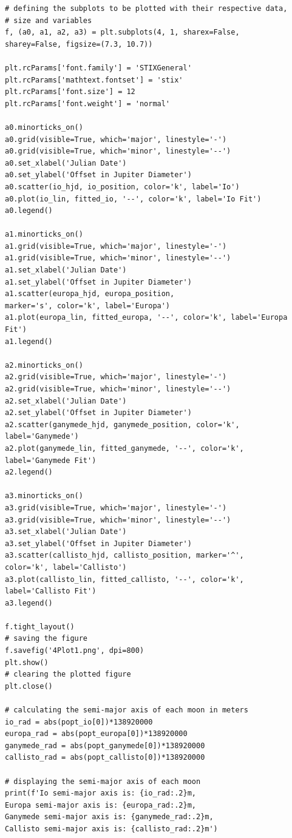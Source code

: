 \documentclass[12pt, a4paper]{article}
\begin{document}
\begin{verbatim}
# defining the subplots to be plotted with their respective data,
# size and variables
f, (a0, a1, a2, a3) = plt.subplots(4, 1, sharex=False, 
sharey=False, figsize=(7.3, 10.7))

plt.rcParams['font.family'] = 'STIXGeneral'
plt.rcParams['mathtext.fontset'] = 'stix'
plt.rcParams['font.size'] = 12
plt.rcParams['font.weight'] = 'normal'

a0.minorticks_on()
a0.grid(visible=True, which='major', linestyle='-')
a0.grid(visible=True, which='minor', linestyle='--')
a0.set_xlabel('Julian Date')
a0.set_ylabel('Offset in Jupiter Diameter')
a0.scatter(io_hjd, io_position, color='k', label='Io')
a0.plot(io_lin, fitted_io, '--', color='k', label='Io Fit')
a0.legend()

a1.minorticks_on()
a1.grid(visible=True, which='major', linestyle='-')
a1.grid(visible=True, which='minor', linestyle='--')
a1.set_xlabel('Julian Date')
a1.set_ylabel('Offset in Jupiter Diameter')
a1.scatter(europa_hjd, europa_position, 
marker='s', color='k', label='Europa')
a1.plot(europa_lin, fitted_europa, '--', color='k', label='Europa Fit')
a1.legend()

a2.minorticks_on()
a2.grid(visible=True, which='major', linestyle='-')
a2.grid(visible=True, which='minor', linestyle='--')
a2.set_xlabel('Julian Date')
a2.set_ylabel('Offset in Jupiter Diameter')
a2.scatter(ganymede_hjd, ganymede_position, color='k', label='Ganymede')
a2.plot(ganymede_lin, fitted_ganymede, '--', color='k', label='Ganymede Fit')
a2.legend()

a3.minorticks_on()
a3.grid(visible=True, which='major', linestyle='-')
a3.grid(visible=True, which='minor', linestyle='--')
a3.set_xlabel('Julian Date')
a3.set_ylabel('Offset in Jupiter Diameter')
a3.scatter(callisto_hjd, callisto_position, marker='^', 
color='k', label='Callisto')
a3.plot(callisto_lin, fitted_callisto, '--', color='k', label='Callisto Fit')
a3.legend()

f.tight_layout()
# saving the figure
f.savefig('4Plot1.png', dpi=800)
plt.show()
# clearing the plotted figure
plt.close()

# calculating the semi-major axis of each moon in meters
io_rad = abs(popt_io[0])*138920000
europa_rad = abs(popt_europa[0])*138920000
ganymede_rad = abs(popt_ganymede[0])*138920000
callisto_rad = abs(popt_callisto[0])*138920000

# displaying the semi-major axis of each moon
print(f'Io semi-major axis is: {io_rad:.2}m, 
Europa semi-major axis is: {europa_rad:.2}m, 
Ganymede semi-major axis is: {ganymede_rad:.2}m, 
Callisto semi-major axis is: {callisto_rad:.2}m')


\end{verbatim}
\end{document}
